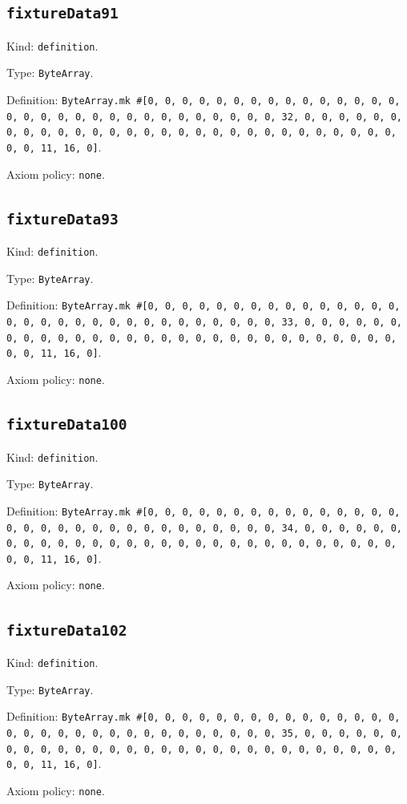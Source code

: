 \documentclass[11pt]{article}
\begin{document}
\subsection*{\texttt{fixtureData91}}
\noindent Kind: \texttt{definition}.\par
\noindent Type: \texttt{ByteArray}.\par
\noindent Definition: \texttt{ByteArray.mk \#[0, 0, 0, 0, 0, 0, 0, 0, 0, 0, 0, 0, 0, 0, 0, 0, 0, 0, 0, 0, 0, 0, 0, 0, 0, 0, 0, 0, 0, 0, 0, 32, 0, 0, 0, 0, 0, 0, 0, 0, 0, 0, 0, 0, 0, 0, 0, 0, 0, 0, 0, 0, 0, 0, 0, 0, 0, 0, 0, 0, 0, 0, 0, 11, 16, 0]}.\par
\noindent Axiom policy: \texttt{none}.\par
\subsection*{\texttt{fixtureData93}}
\noindent Kind: \texttt{definition}.\par
\noindent Type: \texttt{ByteArray}.\par
\noindent Definition: \texttt{ByteArray.mk \#[0, 0, 0, 0, 0, 0, 0, 0, 0, 0, 0, 0, 0, 0, 0, 0, 0, 0, 0, 0, 0, 0, 0, 0, 0, 0, 0, 0, 0, 0, 0, 33, 0, 0, 0, 0, 0, 0, 0, 0, 0, 0, 0, 0, 0, 0, 0, 0, 0, 0, 0, 0, 0, 0, 0, 0, 0, 0, 0, 0, 0, 0, 0, 11, 16, 0]}.\par
\noindent Axiom policy: \texttt{none}.\par
\subsection*{\texttt{fixtureData100}}
\noindent Kind: \texttt{definition}.\par
\noindent Type: \texttt{ByteArray}.\par
\noindent Definition: \texttt{ByteArray.mk \#[0, 0, 0, 0, 0, 0, 0, 0, 0, 0, 0, 0, 0, 0, 0, 0, 0, 0, 0, 0, 0, 0, 0, 0, 0, 0, 0, 0, 0, 0, 0, 34, 0, 0, 0, 0, 0, 0, 0, 0, 0, 0, 0, 0, 0, 0, 0, 0, 0, 0, 0, 0, 0, 0, 0, 0, 0, 0, 0, 0, 0, 0, 0, 11, 16, 0]}.\par
\noindent Axiom policy: \texttt{none}.\par
\subsection*{\texttt{fixtureData102}}
\noindent Kind: \texttt{definition}.\par
\noindent Type: \texttt{ByteArray}.\par
\noindent Definition: \texttt{ByteArray.mk \#[0, 0, 0, 0, 0, 0, 0, 0, 0, 0, 0, 0, 0, 0, 0, 0, 0, 0, 0, 0, 0, 0, 0, 0, 0, 0, 0, 0, 0, 0, 0, 35, 0, 0, 0, 0, 0, 0, 0, 0, 0, 0, 0, 0, 0, 0, 0, 0, 0, 0, 0, 0, 0, 0, 0, 0, 0, 0, 0, 0, 0, 0, 0, 11, 16, 0]}.\par
\noindent Axiom policy: \texttt{none}.\par
\end{document}
